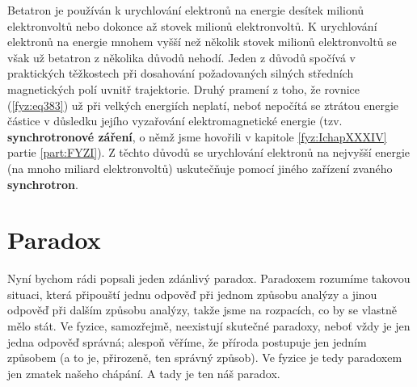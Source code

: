 {  Betatron je používán k urychlování elektronů na energie desítek milionů elektronvoltů nebo 
  dokonce až stovek milionů elektronvoltů. K urychlování elektronů na energie mnohem vyšší než 
  několik stovek milionů elektronvoltů se však už betatron z několika důvodů nehodí. Jeden z důvodů 
  spočívá v praktických těžkostech při dosahování požadovaných silných středních magnetických polí 
  uvnitř trajektorie. Druhý pramení z toho, že rovnice (\ref{fyz:eq383}) už při velkých energiích 
  neplatí, neboť nepočítá se ztrátou energie částice v důsledku jejího vyzařování elektromagnetické 
  energie (tzv. \textbf{synchrotronové záření}, o němž jsme hovořili v kapitole \ref{fyz:IchapXXXIV} partie 
  \ref{part:FYZI}). Z těchto důvodů se urychlování elektronů na nejvyšší energie (na mnoho miliard 
  elektronvoltů) uskutečňuje pomocí jiného zařízení zvaného \textbf{synchrotron}.
  
\section{Paradox}\label{fyz:IIchapXVIIsecIV}
  Nyní bychom rádi popsali jeden zdánlivý paradox. Paradoxem rozumíme takovou situaci, která 
  připouští jednu odpověď při jednom způsobu analýzy a jinou odpověď při dalším způsobu analýzy, 
  takže jsme na rozpacích, co by se vlastně mělo stát. Ve fyzice, samozřejmě, neexistují skutečné 
  paradoxy, neboť vždy je jen jedna odpověď správná; alespoň věříme, že příroda postupuje jen 
  jedním způsobem (a to je, přirozeně, ten správný způsob). Ve fyzice je tedy paradoxem jen zmatek 
  našeho chápání. A tady je ten náš paradox.
  
}
